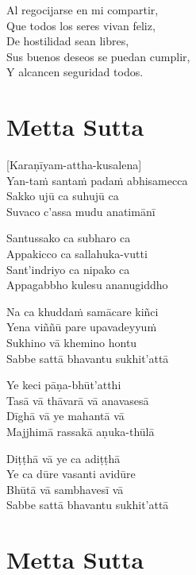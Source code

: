 \begin{english}
	Al regocijarse en mi compartir,\\
	Que todos los seres vivan feliz,\\
	De hostilidad sean libres,\\
	Sus buenos deseos se puedan cumplir,\\
	Y alcancen seguridad todos.
\end{english}

\chapter[Metta Sutta]{Metta Sutta}

\delegateSetUseNext


\begin{leader}
\end{leader}

[Karaṇīyam-attha-kusalena]\\
Yan-taṁ santaṁ padaṁ abhisamecca\\
Sakko ujū ca suhujū ca\\
Suvaco c'assa mudu anatimānī

Santussako ca subharo ca\\
Appakicco ca sallahuka-vutti\\
Sant'indriyo ca nipako ca\\
Appagabbho kulesu ananugiddho

Na ca khuddaṁ samācare kiñci\\
Yena viññū pare upavadeyyuṁ\\
Sukhino vā khemino hontu\\
Sabbe sattā bhavantu sukhit'attā

Ye keci pāṇa-bhūt'atthi\\
Tasā vā thāvarā vā anavasesā\\
Dīghā vā ye mahantā vā\\
Majjhimā rassakā aṇuka-thūlā

Diṭṭhā vā ye ca adiṭṭhā\\
Ye ca dūre vasanti avidūre\\
Bhūtā vā sambhavesī vā\\
Sabbe sattā bhavantu sukhit'attā

\chapter*[Metta Sutta]{Metta Sutta}

